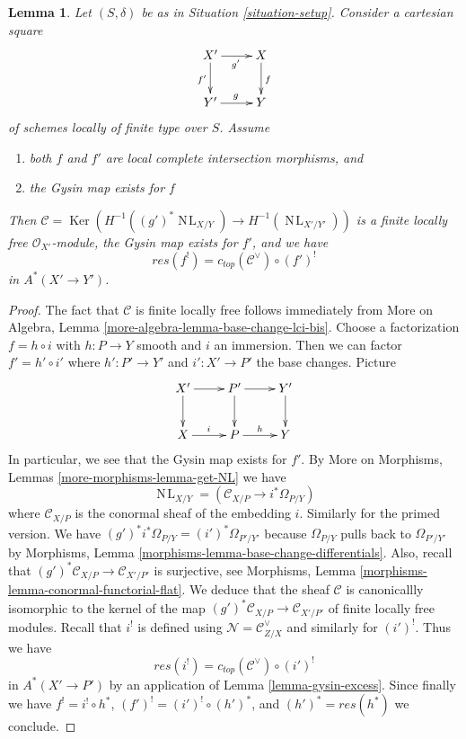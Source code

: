 \documentclass[10pt,a4paper]{amsart}
\theoremstyle{plain}
\newtheorem{lemma}[subsection]{Lemma}
\theoremstyle{definition}
\theoremstyle{remark}
\numberwithin{equation}{subsection}
\def\NL{\mathop{N\!L}\nolimits}
\def\Ker{\mathop{\mathrm{Ker}}}
\begin{document}
\begin{lemma}
\label{lemma-compare-gysin-base-change}
Let $(S, \delta)$ be as in Situation \ref{situation-setup}.
Consider a cartesian square
$$
\xymatrix{
X' \ar[d]_{f'} \ar[r]_{g'} &
X \ar[d]^f \\
Y' \ar[r]^g &
Y
}
$$
of schemes locally of finite type over $S$. Assume
\begin{enumerate}
\item both $f$ and $f'$ are local complete intersection morphisms, and
\item the Gysin map exists for $f$
\end{enumerate}
Then $\mathcal{C} = \Ker(H^{-1}((g')^*\NL_{X/Y}) \to H^{-1}(\NL_{X'/Y'}))$
is a finite locally free $\mathcal{O}_{X'}$-module, the Gysin map
exists for $f'$, and we have
$$
res(f^!) = c_{top}(\mathcal{C}^\vee) \circ (f')^!
$$
in $A^*(X' \to Y')$.
\end{lemma}

\begin{proof}
The fact that $\mathcal{C}$ is finite locally free follows immediately
from More on Algebra, Lemma \ref{more-algebra-lemma-base-change-lci-bis}.
Choose a factorization $f = h \circ i$ with $h : P \to Y$ smooth and $i$
an immersion. Then we can factor $f' = h' \circ i'$ where $h' : P' \to Y'$
and $i' : X' \to P'$ the base changes. Picture
$$
\xymatrix{
X' \ar[r] \ar[d] &
P' \ar[r] \ar[d] &
Y' \ar[d] \\
X \ar[r]^i &
P \ar[r]^h &
Y
}
$$
In particular, we see that the Gysin map exists for $f'$. By
More on Morphisms, Lemmas \ref{more-morphisms-lemma-get-NL}
we have
$$
\NL_{X/Y} = \left( \mathcal{C}_{X/P} \to i^*\Omega_{P/Y} \right)
$$
where $\mathcal{C}_{X/P}$ is the conormal sheaf of the embedding $i$.
Similarly for the primed version. We have
$(g')^*i^*\Omega_{P/Y} = (i')^*\Omega_{P'/Y'}$ because
$\Omega_{P/Y}$ pulls back to $\Omega_{P'/Y'}$ by
Morphisms, Lemma \ref{morphisms-lemma-base-change-differentials}.
Also, recall that $(g')^*\mathcal{C}_{X/P} \to \mathcal{C}_{X'/P'}$
is surjective, see
Morphisms, Lemma \ref{morphisms-lemma-conormal-functorial-flat}.
We deduce that the sheaf $\mathcal{C}$ is canonicallly
isomorphic to the kernel of the map
$(g')^*\mathcal{C}_{X/P} \to \mathcal{C}_{X'/P'}$
of finite locally free modules. Recall that $i^!$ is defined
using $\mathcal{N} = \mathcal{C}_{Z/X}^\vee$ and similarly
for $(i')^!$. Thus we have
$$
res(i^!) = c_{top}(\mathcal{C}^\vee) \circ (i')^!
$$
in $A^*(X' \to P')$ by an application of Lemma \ref{lemma-gysin-excess}.
Since finally we have $f^! = i^! \circ h^*$,
$(f')^! = (i')^! \circ (h')^*$, and $(h')^* = res(h^*)$ we conclude.
\end{proof}
\end{document}

